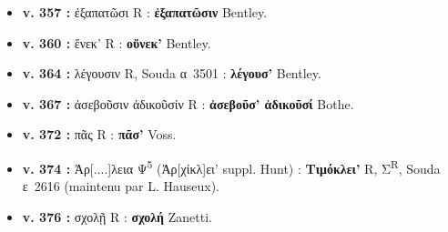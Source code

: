 \documentclass[10pt, a4paper, twoside]{book}
\renewcommand{\_}{\origunderscore\penalty0\relax}
\providecommand{\lecon}[1]{\textbf{#1}}
\providecommand{\PsiCinq}{\textgreek{Ψ}\textsuperscript{5}}
\begin{document}
\begin{itemize}
\begin{itemize}
    \item \textbf{v. 357 :} ἐξαπατῶσι R : \lecon{ἐξαπατῶσιν} Bentley.
    \item \textbf{v. 360 :} ἕνεκ' R : \lecon{οὕνεκ'} Bentley.
    \item \textbf{v. 364 :} λέγουσιν R, Souda α~3501 : \lecon{λέγουσ'} Bentley.
    \item \textbf{v. 367 :} ἀσεβοῦσιν ἀδικοῦσίν R : \lecon{ἀσεβοῦσ' ἀδικοῦσί} Bothe.
    \item \textbf{v. 372 :} πᾶς R : \lecon{πᾶσ'} Voss.
    \item \textbf{v. 374 :} Ἀρ[....]λεια \PsiCinq{} (Ἀρ[χίκλ]ει' suppl. Hunt) : \lecon{Τιμόκλει'} R, Σ\textsuperscript{R}, Souda ε~2616 (maintenu par L. Hauseux).
    \item \textbf{v. 376 :} σχολῇ R : \lecon{σχολή} Zanetti.
  \end{itemize}
\end{itemize}
\end{document}
